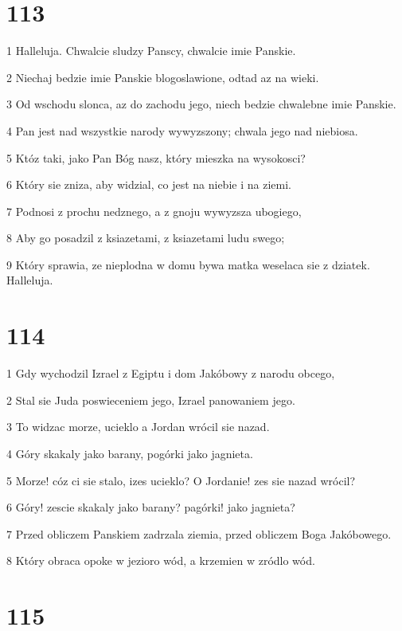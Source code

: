 \chapter{113}

\par 1 Halleluja. Chwalcie sludzy Panscy, chwalcie imie Panskie.
\par 2 Niechaj bedzie imie Panskie blogoslawione, odtad az na wieki.
\par 3 Od wschodu slonca, az do zachodu jego, niech bedzie chwalebne imie Panskie.
\par 4 Pan jest nad wszystkie narody wywyzszony; chwala jego nad niebiosa.
\par 5 Któz taki, jako Pan Bóg nasz, który mieszka na wysokosci?
\par 6 Który sie zniza, aby widzial, co jest na niebie i na ziemi.
\par 7 Podnosi z prochu nedznego, a z gnoju wywyzsza ubogiego,
\par 8 Aby go posadzil z ksiazetami, z ksiazetami ludu swego;
\par 9 Który sprawia, ze nieplodna w domu bywa matka weselaca sie z dziatek. Halleluja.

\chapter{114}

\par 1 Gdy wychodzil Izrael z Egiptu i dom Jakóbowy z narodu obcego,
\par 2 Stal sie Juda poswieceniem jego, Izrael panowaniem jego.
\par 3 To widzac morze, ucieklo a Jordan wrócil sie nazad.
\par 4 Góry skakaly jako barany, pogórki jako jagnieta.
\par 5 Morze! cóz ci sie stalo, izes ucieklo? O Jordanie! zes sie nazad wrócil?
\par 6 Góry! zescie skakaly jako barany? pagórki! jako jagnieta?
\par 7 Przed obliczem Panskiem zadrzala ziemia, przed obliczem Boga Jakóbowego.
\par 8 Który obraca opoke w jezioro wód, a krzemien w zródlo wód.

\chapter{115}

